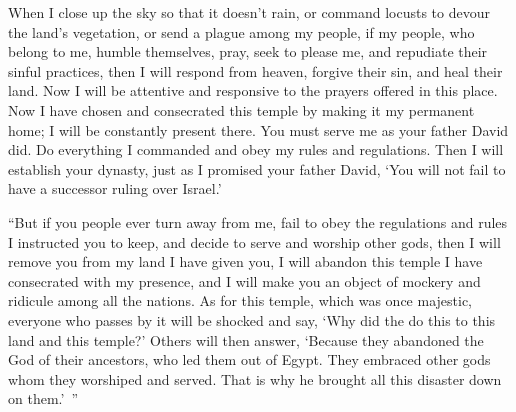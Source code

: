 {When I
close
up the sky
so that it
doesn’t
rain,
or command
locusts
to devour
the land’s
vegetation, or
send
a plague
among my people,
if my people,
who
belong to me,
humble
themselves, pray,
seek
to please me,
and repudiate
their sinful practices,
then I
will respond
from
heaven,
forgive
their sin,
and heal
their land.
Now
I will be
attentive
and responsive
to the prayers
offered in this
place.
Now
I have chosen
and consecrated
this
temple
by
making it my permanent
home; I will be
constantly
present
there.
You
must
serve
me as
your father
David
did. Do
everything
I commanded
and obey
my rules
and regulations.
Then I will establish
your dynasty,
just as
I promised
your father
David,
‘You will not
fail
to have a successor
ruling over
Israel.’
\par }{\PP {}“But if
you
people
ever turn
away from me, fail
to obey the regulations and rules
I instructed you to keep, and decide
to serve
and worship
other
gods,
then I will remove
you from my land
I have
given
you, I will abandon this
temple
I have
consecrated
with my presence,
and I will
make you an object of mockery
and ridicule
among all
the nations.
As for this
temple,
which
was once majestic,
everyone
who passes
by it will be shocked
and say,
‘Why
did
the {}
do this
to this land
and this
temple?’
Others will then answer, ‘Because they abandoned
the {}
God
of their ancestors,
who
led
them out of Egypt.
They embraced
other
gods
whom they worshiped
and served.
That is why
he brought
all
this
disaster
down on them.’ ”

}
